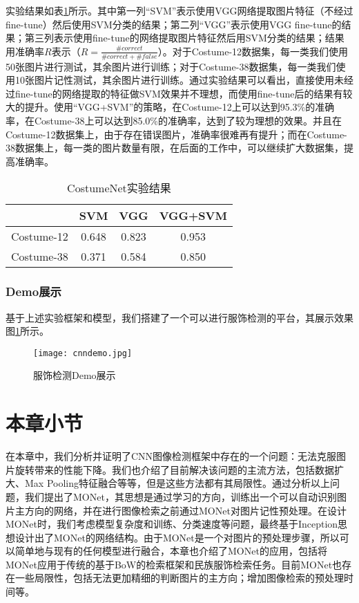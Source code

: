 实验结果如表\ref{tab:costume}所示。其中第一列“SVM”表示使用VGG网络提取图片特征（不经过fine-tune）然后使用SVM分类的结果；第二列“VGG”表示使用VGG fine-tune的结果；第三列表示使用fine-tune的网络提取图片特征然后用SVM分类的结果；结果用准确率$R$表示（$R=\frac{\#correct}{\#correct+\#false}$）。对于Costume-12数据集，每一类我们使用50张图片进行测试，其余图片进行训练；对于Costume-38数据集，每一类我们使用10张图片记性测试，其余图片进行训练。通过实验结果可以看出，直接使用未经过fine-tune的网络提取的特征做SVM效果并不理想，而使用fine-tune后的结果有较大的提升。使用“VGG+SVM”的策略，在Costume-12上可以达到95.3\%的准确率，在Costume-38上可以达到85.0\%的准确率，达到了较为理想的效果。并且在Costume-12数据集上，由于存在错误图片，准确率很难再有提升；而在Costume-38数据集上，每一类的图片数量有限，在后面的工作中，可以继续扩大数据集，提高准确率。
\begin{table}
	\begin{center}
		\begin{tabular}{|c|c|c|c|}
			\hline
			           & SVM & VGG & VGG+SVM \\
			\hline
			Costume-12 & 0.648 & 0.823 & 0.953\\
			\hline
			Costume-38 & 0.371 & 0.584 &0.850\\
			\hline
		\end{tabular}
	\end{center}
	\caption{CostumeNet实验结果}
	\label{tab:costume}
\end{table}

\subsubsection{Demo展示}
基于上述实验框架和模型，我们搭建了一个可以进行服饰检测的平台，其展示效果图\ref{fig:costume-demo}所示。
\begin{figure}
	\centering
	\texttt{[image: cnndemo.jpg]}
	\caption{服饰检测Demo展示}\label{fig:costume-demo}
\end{figure}


\section{本章小节}
在本章中，我们分析并证明了CNN图像检测框架中存在的一个问题：无法克服图片旋转带来的性能下降。我们也介绍了目前解决该问题的主流方法，包括数据扩大、Max Pooling特征融合等等，但是这些方法都有其局限性。通过分析以上问题，我们提出了MONet，其思想是通过学习的方向，训练出一个可以自动识别图片主方向的网络，并在进行图像检索之前通过MONet对图片记性预处理。在设计MONet时，我们考虑模型复杂度和训练、分类速度等问题，最终基于Inception思想设计出了MONet的网络结构。由于MONet是一个对图片的预处理步骤，所以可以简单地与现有的任何模型进行融合，本章也介绍了MONet的应用，包括将MONet应用于传统的基于BoW的检索框架和民族服饰检索任务。目前MONet也存在一些局限性，包括无法更加精细的判断图片的主方向；增加图像检索的预处理时间等。







